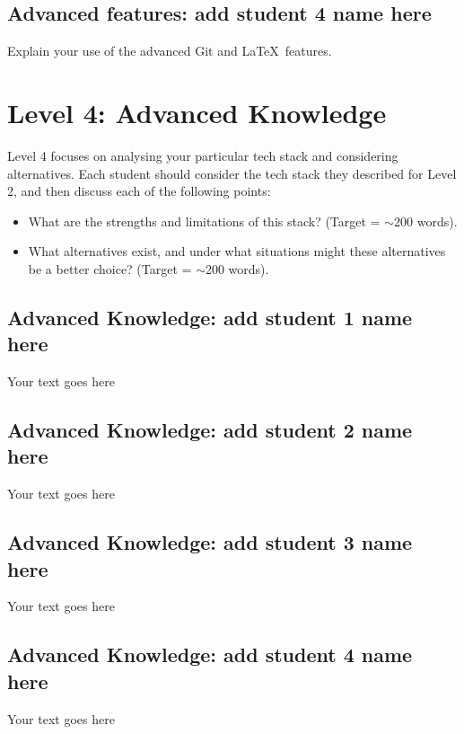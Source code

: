 \documentclass[a4paper, 11pt]{report}
\begin{document}
\subsection{Advanced features: add student 4 name here}

Explain your use of the advanced Git and \LaTeX\ features. 




\newpage
\section{Level 4: Advanced Knowledge}

Level 4 focuses on analysing your particular tech stack and considering alternatives. Each student should consider the tech stack they described for Level 2, and then discuss each of the following points:
\begin{itemize}
    \item What are the strengths and limitations of this stack? (Target = $\sim$200 words).
    \item What alternatives exist, and under what situations might these alternatives be a better choice? (Target = $\sim$200 words).
\end{itemize}

\subsection{Advanced Knowledge: add student 1 name here}

Your text goes here

\subsection{Advanced Knowledge: add student 2 name here}

Your text goes here

\subsection{Advanced Knowledge: add student 3 name here}

Your text goes here

\subsection{Advanced Knowledge: add student 4 name here}

Your text goes here




\newpage



\end{document}
